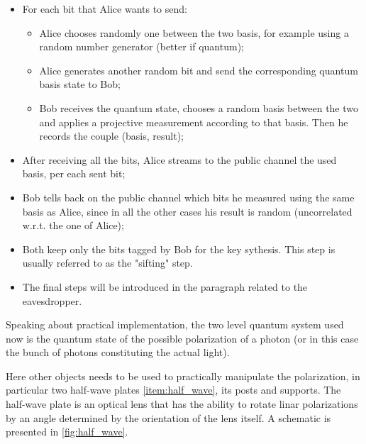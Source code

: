 \begin{itemize}
\begin{table}[h]
  \end{table}
\item For each bit that Alice wants to send:
  \begin{itemize}
    \item Alice chooses randomly one between the two basis, for
      example using a random number generator (better if quantum);
    \item Alice generates another random bit and send the
      corresponding quantum basis state to Bob;
    \item Bob receives the quantum state, chooses a random basis
      between the two and applies a projective measurement
      according to that basis. Then he records the couple (basis, result);
  \end{itemize}
\item After receiving all the bits, Alice streams to the public
  channel the used basis, per each sent bit;
\item Bob tells back on the public channel which bits he measured
  using the same basis as Alice, since in all the other cases his
  result is random (uncorrelated w.r.t. the one of Alice);
\item Both keep only the bits tagged by Bob for the key sythesis.
  This step is usually referred to as the "sifting" step.
\item The final steps will be introduced in the paragraph related
  to the eavesdropper.
\end{itemize}

Speaking about practical implementation, the two level quantum system
used now is the quantum state of the possible polarization of a
photon (or in this case the bunch of photons constituting the actual light).

Here other objects needs to be used to practically manipulate the
polarization, in
particular two half-wave plates \cref{item:half_wave}, its posts and supports.
The half-wave plate is an optical lens that has the ability to rotate
linar polarizations by an angle determined by the orientation of the
lens itself. A schematic is presented in \cref{fig:half_wave}.

